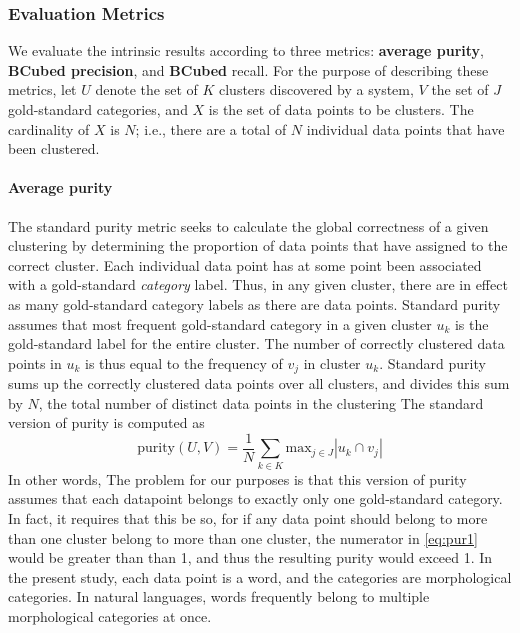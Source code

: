 \subsubsection{Evaluation Metrics} 
\label{sec:metrics}
We evaluate the intrinsic results according to three metrics: \textbf{average purity}, \textbf{BCubed precision}, and
 \textbf{BCubed} recall. For the purpose of describing these metrics,
 let $U$ denote the set of $K$ clusters discovered by a system, $V$ the set of $J$ gold-standard categories, and $X$ is the set of data points to be clusters. The cardinality of $X$ is $N$; i.e., there are a total of $N$ individual data points that have been clustered.
\paragraph{Average purity}
The standard purity metric seeks to calculate the global correctness of a 
given clustering by determining the proportion of data points that have 
assigned to the correct cluster. Each individual data point has at some 
point been associated with a gold-standard \emph{category} label. Thus, 
in any given cluster, there are in effect as many gold-standard category 
labels as there are data points. Standard purity assumes that most frequent 
 gold-standard category in a given cluster $u_k$ is the gold-standard label for the entire cluster. The number of correctly clustered data points in $u_k$ is thus equal to the frequency of  $v_j$ in cluster $u_k$. Standard purity sums up the correctly clustered data points over all clusters, and divides this sum by $N$, the total number of distinct data points in the clustering
 The standard version of purity is computed as 
\begin{equation} \label{eq:pur1}
\text{purity}(U, V) = \frac{1}{N} \sum_{k \in K} \text{max}_{j \in J} |u_k \cap v_j|
\end{equation}
In other words, 
The problem for our purposes is that this version of purity assumes that each datapoint belongs to exactly only one gold-standard category. In fact, it requires that this be so, for if any data point should belong to more than one cluster belong to more than one cluster, the numerator in \eqref{eq:pur1} would be greater than than 1, and thus the resulting purity would exceed 1.
In the present study, each data point is a word, and the categories are morphological categories. In natural languages, words frequently belong to multiple morphological categories at once.

